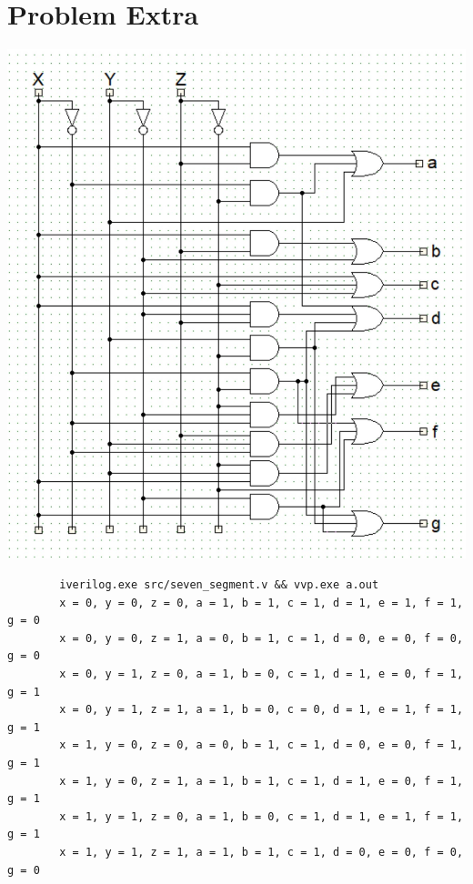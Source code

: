 \documentclass{article}
\newenvironment{problem}[1]{
  \nobreak\section*{Problem #1}
}{}
\begin{document}
\begin{problem}{Extra}
    \begin{center}
      \includegraphics[scale=0.8]{images/seven_segment.jpg}
    \end{center}

    \begin{center}
      \begin{lstlisting}
        iverilog.exe src/seven_segment.v && vvp.exe a.out
        x = 0, y = 0, z = 0, a = 1, b = 1, c = 1, d = 1, e = 1, f = 1, g = 0
        x = 0, y = 0, z = 1, a = 0, b = 1, c = 1, d = 0, e = 0, f = 0, g = 0
        x = 0, y = 1, z = 0, a = 1, b = 0, c = 1, d = 1, e = 0, f = 1, g = 1
        x = 0, y = 1, z = 1, a = 1, b = 0, c = 0, d = 1, e = 1, f = 1, g = 1
        x = 1, y = 0, z = 0, a = 0, b = 1, c = 1, d = 0, e = 0, f = 1, g = 1
        x = 1, y = 0, z = 1, a = 1, b = 1, c = 1, d = 1, e = 0, f = 1, g = 1
        x = 1, y = 1, z = 0, a = 1, b = 0, c = 1, d = 1, e = 1, f = 1, g = 1
        x = 1, y = 1, z = 1, a = 1, b = 1, c = 1, d = 0, e = 0, f = 0, g = 0
      \end{lstlisting}
    \end{center}
  \end{problem}
\end{document}
